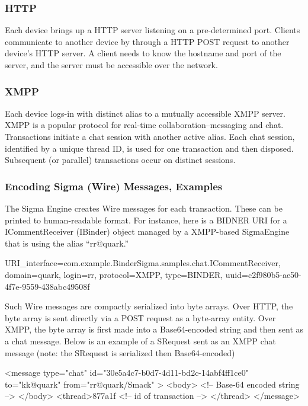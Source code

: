 \documentclass[prodmode]{acmlarge}
\begin{document}
\subsubsection{HTTP}
Each device brings up a HTTP server listening on a pre-determined port. Clients communicate to another device by through a HTTP POST request to another device's HTTP server. A client needs to know the hostname and port of the server, and the server must be accessible over the network.

\subsubsection{XMPP}
Each device logs-in with distinct alias to a mutually accessible XMPP server. XMPP is a popular protocol for real-time collaboration--messaging and chat. Transactions initiate a chat session with another active alias. Each chat session, identified by a unique thread ID, is used for one transaction and then disposed. Subsequent (or parallel) transactions occur on distinct sessions.

\subsubsection{Encoding Sigma (Wire) Messages, Examples}
The Sigma Engine creates Wire messages for each transaction. These can be printed to human-readable format. For instance, here is a BIDNER URI for a ICommentReceiver (IBinder) object managed by a XMPP-based SigmaEngine that is using the alias ``rr@quark.''

\begin{snippet}
URI{_interface=com.example.BinderSigma.samples.chat.ICommentReceiver,
domain=quark, login=rr, protocol=XMPP, type=BINDER,
uuid=c2f980b5-ae50-4f7e-9559-438abc49508f}
\end{snippet}

Such Wire messages are compactly serialized into byte arrays. Over HTTP, the byte array is sent directly via a POST request as a byte-array entity. Over XMPP, the byte array is first made into a Base64-encoded string and then sent as a chat message. Below is an example of a SRequest sent as an XMPP chat message (note: the SRequest is serialized then Base64-encoded)

\begin{snippet}
<message type="chat" id="30e5a4c7-b0d7-4d11-bd2c-14abf4ff1ce0"
        to="kk@quark" from="rr@quark/Smack" >
        <body> <!-- Base-64 encoded string --> </body>
        <thread>877a1f <!-- id of transaction --> </thread>
        </message>
\end{snippet}
\end{document}
